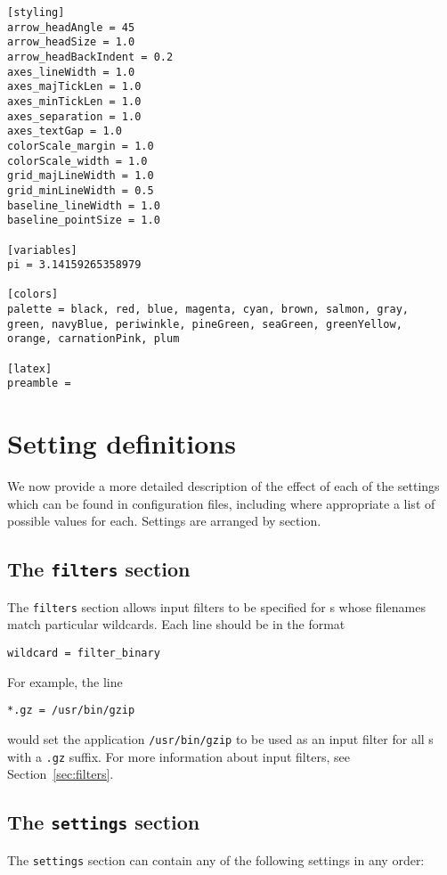 \begin{verbatim}
[styling]
arrow_headAngle = 45
arrow_headSize = 1.0
arrow_headBackIndent = 0.2
axes_lineWidth = 1.0
axes_majTickLen = 1.0
axes_minTickLen = 1.0
axes_separation = 1.0
axes_textGap = 1.0
colorScale_margin = 1.0
colorScale_width = 1.0
grid_majLineWidth = 1.0
grid_minLineWidth = 0.5
baseline_lineWidth = 1.0
baseline_pointSize = 1.0

[variables]
pi = 3.14159265358979

[colors]
palette = black, red, blue, magenta, cyan, brown, salmon, gray,
green, navyBlue, periwinkle, pineGreen, seaGreen, greenYellow,
orange, carnationPink, plum

[latex]
preamble =
\end{verbatim}

\section{Setting definitions}

We now provide a more detailed description of the effect of each of the
settings which can be found in configuration files, including where appropriate
a list of possible values for each. Settings are arranged by section.

\subsection{The {\tt filters} section}

The {\tt filters} section allows input filters to be specified for \datafile s
whose filenames match particular wildcards. Each line should be in the format
\begin{verbatim}
wildcard = filter_binary
\end{verbatim}
For example, the line
\begin{verbatim}
*.gz = /usr/bin/gzip
\end{verbatim}
would set the application {\tt /usr/bin/gzip} to be used as an input filter for
all \datafile s with a {\tt .gz} suffix. For more information about input
filters, see Section~\ref{sec:filters}.

\subsection{The {\tt settings} section}
\label{sec:configfile_settings}

The {\tt settings} section can contain any of the following settings in any order:

